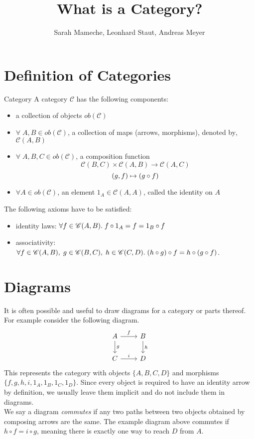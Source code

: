 
\def\pathToRoot{../}

\usepackage{charter}
\selectfont


\title{What is a Category?}
\author{Sarah Mameche, Leonhard Staut, Andreas Meyer}
\maketitle

\section {Definition of Categories}
\begin{definition}{Category}
	A category $\mathscr{C}$ has the following components:
	\begin{itemize}
		\item a collection of objects $ob(\mathscr{C})$
		\item $\forall \; A, B \in ob(\mathscr{C})$, a collection of maps (arrows, morphisms), denoted by‚ $\mathscr{C}(A, B)$
		\item $\forall \; A, B, C \in ob(\mathscr{C})$, a composition function
		\[\mathscr{C}(B, C) \times \mathscr{C}(A, B) \rightarrow  \mathscr{C}(A, C)
		\]		\[ (g,f) \mapsto (g \mathbin{\circ} f)
		\]
		\item $\forall A \in ob(\mathscr{C})$, an element $1_A \in \mathscr{C}(A, A)$, called the identity on $A$ 
 	\end{itemize}
 The following axioms have to be satisfied:
 \begin{itemize}
 	\item identity laws: $\forall f \in \mathscr{C}(A, B). \; f \mathbin{\circ} 1_A = f = 1_B \mathbin{\circ} f$ 
 	\item associativity: $\forall f \in \mathscr{C}(A, B), \; g \in \mathscr{C}(B, C), \; h \in \mathscr{C}(C, D). \; (h \mathbin{\circ} g) \mathbin{\circ} f = h \mathbin{\circ} (g \mathbin{\circ} f) $.
 \end{itemize}
\end{definition}

\section {Diagrams}
It is often possible and useful to draw diagrams for a category or parts thereof.
For example consider the following diagram.
\[
  \begin{tikzcd}
    A \arrow{r}{f} \arrow{d}{g} & B \arrow{d}{h} \\
    C \arrow{r}{i}              & D 
  \end{tikzcd}
\]
This represents the category with objects $\{A, B, C, D\}$ and
morphisms $\{f, g, h, i, 1_A, 1_B, 1_C, 1_D \}$.
Since every object is required to have an identity arrow by definition,
we usually leave them implicit and do not include them in diagrams.\\
We say a diagram \emph{commutes} if any two paths between two objects
obtained by composing arrows are the same.
The example diagram above commutes if $ h \circ f = i \circ g $, meaning there is
exactly one way to reach $D$ from $A$.


